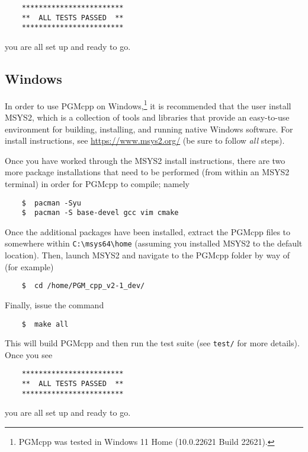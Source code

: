 \documentclass[12pt, letterpaper]{report}
\begin{document}
\begin{verbatim}
    ************************
    **  ALL TESTS PASSED  **
    ************************
\end{verbatim}

\noindent you are all set up and ready to go.

\subsection{Windows}

In order to use PGMcpp on Windows,\footnote{PGMcpp was tested in Windows 11 Home (10.0.22621 Build 22621).} it is recommended that the user install MSYS2, which is a collection of tools and libraries that provide an easy-to-use environment for building, installing, and running native Windows software. For install instructions, see \url{https://www.msys2.org/} (be sure to follow \textit{all} steps).\par
Once you have worked through the MSYS2 install instructions, there are two more package installations that need to be performed (from within an MSYS2 terminal) in order for PGMcpp to compile; namely

\begin{verbatim}
    $  pacman -Syu
    $  pacman -S base-devel gcc vim cmake
\end{verbatim}

Once the additional packages have been installed, extract the PGMcpp files to somewhere within \texttt{C:\textbackslash msys64\textbackslash home} (assuming you installed MSYS2 to the default location). Then, launch MSYS2 and navigate to the PGMcpp folder by way of (for example)

\begin{verbatim}
    $  cd /home/PGM_cpp_v2-1_dev/
\end{verbatim}

\noindent Finally, issue the command

\begin{verbatim}
    $  make all
\end{verbatim}

\noindent This will build PGMcpp and then run the test suite (see \texttt{test/} for more details). Once you see

\begin{verbatim}
    ************************
    **  ALL TESTS PASSED  **
    ************************
\end{verbatim}

\noindent you are all set up and ready to go.
\end{document}
